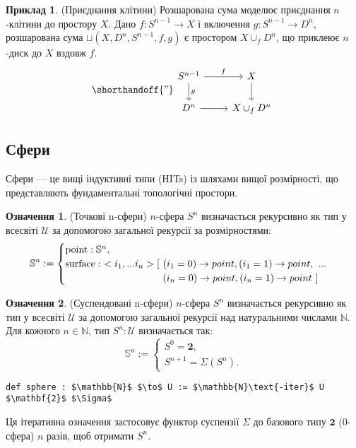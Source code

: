 \documentclass{article}
\theoremstyle{definition}
\newtheorem{definition}{Означення}
\newtheorem{example}{Приклад}
\begin{document}
\begin{example} (Приєднання клітини)
Розшарована сума моделює приєднання \( n \)-клітини до простору \( X \).
Дано \( f : S^{n-1} \to X \) і включення \( g : S^{n-1} \to D^n \),
розшарована сума \( \sqcup(X,D^n,S^{n-1},f,g) \) є
простором \( X \cup_f D^n \), що приклеює \( n \)-диск до \( X \) вздовж \( f \).
\[
\shorthandoff{"}
\begin{tikzcd}
S^{n-1} \arrow[r, "f"] \arrow[d, "g"] & X \arrow[d] \\
D^n \arrow[r] & X \cup_f D^n
\end{tikzcd}
\]
\end{example}

\subsection{Сфери}
Сфери — це вищі індуктивні типи (HITs) із шляхами вищої розмірності,
що представляють фундаментальні топологічні простори.

\begin{definition} (Точкові n-сфери)
\( n \)-сфера \( S^n \) визначається рекурсивно як тип у
всесвіті \( \mathcal{U} \) за допомогою загальної рекурсії за розмірностями:
\[
\mathbb{S}^n :=
\begin{cases}
\text{point} : \mathbb{S}^n, \\
\text{surface} :\ <i_1,...i_n> [\ (i_1=0) \rightarrow point, (i_1=1) \rightarrow point,\ ... \\
\hspace{3.47cm} (i_n=0) \rightarrow point, (i_n=1) \rightarrow point\ ]
\end{cases}
\]
\end{definition}

\begin{definition} (Суспендовані n-сфери)
\( n \)-сфера \( S^n \) визначається рекурсивно як тип у
всесвіті \( \mathcal{U} \) за допомогою загальної рекурсії над натуральними
числами \( \mathbb{N} \). Для кожного \( n \in \mathbb{N} \),
тип \( S^n : \mathcal{U} \) визначається так:
\[
\mathbb{S}^n :=
\begin{cases}
S^0 = \mathbf{2}, \\
S^{n+1} = \Sigma(S^n).
\end{cases}
\]
\begin{lstlisting}[mathescape=true]
def sphere : $\mathbb{N}$ $\to$ U := $\mathbb{N}\text{-iter}$ U $\mathbf{2}$ $\Sigma$
\end{lstlisting}
Ця ітеративна означення застосовує функтор суспензії \( \Sigma \)
до базового типу \( \mathbf{2} \) (0-сфера) \( n \) разів, щоб отримати \( S^n \).
\end{definition}
\end{document}

